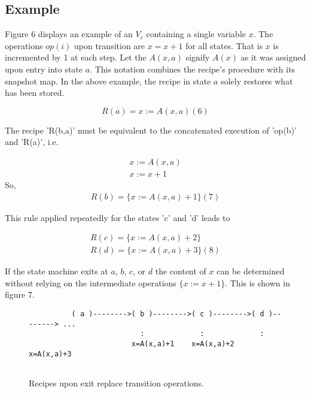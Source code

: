 \documentclass[12pt,a4paper]{scrartcl}
\begin{document}
\subsection{Example}

Figure 6 displays an example of an $V_c$ containing a single variable $x$. The
operations $op(i)$ upon transition are $x=x+1$ for all states. That is $x$ is
incremented by 1 at each step. Let the $A(x,a)$ signify $A(x)$ as it was
assigned upon entry into state $a$. This notation combines the recipe's
procedure with its snapshot map. In the above example, the recipe in state $a$
solely restores what has been stored.

\begin{equation}
\label{eq:}
               R(a) = { x := A(x,a) }                                     (6)
\end{equation}


The recipe 'R(b,a)' must be equivalent to the concatenated execution of 'op(b)'
and 'R(a)', i.e.

\begin{eqnarray}
    { x  :=  A(x,a) } \\
    { x  :=  x + 1 }
\end{eqnarray}
So, 
\begin{eqnarray}
    R(b)  =  \{ x := A(x,a) + 1 \}                                 (7)
\end{eqnarray}

This rule applied repeatedly for the states 'c' and 'd' leads to

\begin{eqnarray}
    R(c)  =  \{ x := A(x,a) + 2 \} \\
    R(d)  =  \{ x := A(x,a) + 3 \}                                 (8)
\end{eqnarray}

If the state machine exits at $a$, $b$, $c$, or $d$ the content of $x$ can be
determined without relying on the intermediate operations $\{ x:=x+1 \}$. This
is shown in figure 7.
 
\begin{figure}[htbp] \leavevmode
\begin{verbatim}
          ( a )-------->( b )-------->( c )-------->( d )--------> ...
                          :             :             :
                        x=A(x,a)+1    x=A(x,a)+2    x=A(x,a)+3


\end{verbatim}
\caption{Recipes upon exit replace transition operations.}
\end{figure}
\end{document}
